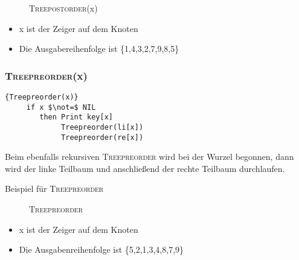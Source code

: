 \documentclass[ngerman,draft,parskip=half*,twoside]{scrreprt}
\theoremstyle{break}
\begin{document}
  \begin{figure}[H]
  \centering  
   \caption{\textsc{Treepostorder}(x)}
   \label{171103b}
  \end{figure}
  \begin{itemize}
   \item x ist der Zeiger auf dem Knoten
   \item Die Ausgabereihenfolge ist \{1,4,3,2,7,9,8,5\}
  \end{itemize}
 
 \subsubsection{\textsc{Treepreorder}(x)}
   \begin{Algorithmus}[H]   
    \begin{lstlisting}[frame=tlrb, mathescape=true, title=\textsc{Treepreorder\textnormal{(x)}}, gobble=4]{Treepreorder(x)}
     if x $\not=$ NIL
        then Print key[x]
             Treepreorder(li[x])
             Treepreorder(re[x])
    \end{lstlisting}

   Beim ebenfalls rekursiven \textsc{Treepreorder} wird bei der Wurzel begonnen, dann wird der 
   linke Teilbaum und anschließend der rechte Teilbaum durchlaufen.
   \end{Algorithmus}
Beispiel für \textsc{Treepreorder}
   
  \begin{figure}[H]
  \centering  
   \caption{\textsc{Treepreorder }}
   \label{171103c}
  \end{figure}
 \begin{itemize}
  \item x ist der Zeiger auf dem Knoten
  \item Die Ausgabenreihenfolge ist \{5,2,1,3,4,8,7,9\}
 \end{itemize}
 
\end{document}
